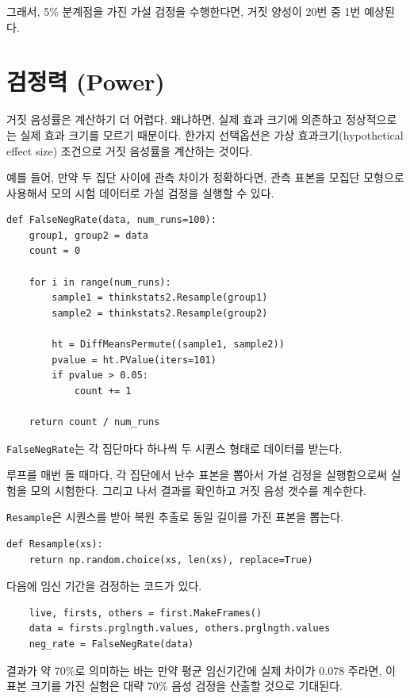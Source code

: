 그래서, 5\% 분계점을 가진 가설 검정을 수행한다면, 거짓 양성이 20번 중 1번 예상된다. 

\section{검정력 (Power)}
\label{power}

거짓 음성률은 계산하기 더 어렵다. 왜냐하면, 실제 효과 크기에 의존하고 정상적으로는 실제 효과 크기를 모르기 때문이다. 한가지 선택옵션은 가상 효과크기(hypothetical effect size) 조건으로 거짓 음성률을 계산하는 것이다.

예를 들어, 만약 두 집단 사이에 관측 차이가 정확하다면, 관측 표본을 모집단 모형으로 사용해서 모의 시험 데이터로 가설 검정을 실행할 수 있다.

\begin{verbatim}
def FalseNegRate(data, num_runs=100):
    group1, group2 = data
    count = 0

    for i in range(num_runs):
        sample1 = thinkstats2.Resample(group1)
        sample2 = thinkstats2.Resample(group2)

        ht = DiffMeansPermute((sample1, sample2))
        pvalue = ht.PValue(iters=101)
        if pvalue > 0.05:
            count += 1

    return count / num_runs
\end{verbatim}

{\tt FalseNegRate}는 각 집단마다 하나씩 두 시퀀스 형태로 데이터를 받는다.

루프를 매번 돌 때마다, 각 집단에서 난수 표본을 뽑아서 가설 검정을 실행함으로써 실험을 모의 시험한다. 그리고 나서 결과를 확인하고 거짓 음성 갯수를 계수한다.

{\tt Resample}은 시퀀스를 받아 복원 추출로 동일 길이를 가진 표본을 뽑는다.

\begin{verbatim}
def Resample(xs):
    return np.random.choice(xs, len(xs), replace=True)
\end{verbatim}

다음에 임신 기간을 검정하는 코드가 있다.

\begin{verbatim}
    live, firsts, others = first.MakeFrames()
    data = firsts.prglngth.values, others.prglngth.values
    neg_rate = FalseNegRate(data)
\end{verbatim}

결과가 약 70\%로 의미하는 바는 만약 평균 임신기간에 실제 차이가 0.078 주라면, 이 표본 크기를 가진 실험은 대략 70\% 음성 검정을 산출할 것으로 기대된다.

